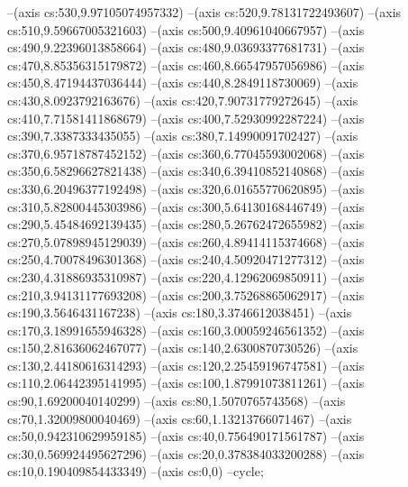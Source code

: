 --(axis cs:530,9.97105074957332)
--(axis cs:520,9.78131722493607)
--(axis cs:510,9.59667005321603)
--(axis cs:500,9.40961040667957)
--(axis cs:490,9.22396013858664)
--(axis cs:480,9.03693377681731)
--(axis cs:470,8.85356315179872)
--(axis cs:460,8.66547957056986)
--(axis cs:450,8.47194437036444)
--(axis cs:440,8.2849118730069)
--(axis cs:430,8.0923792163676)
--(axis cs:420,7.90731779272645)
--(axis cs:410,7.71581411868679)
--(axis cs:400,7.52930992287224)
--(axis cs:390,7.3387333435055)
--(axis cs:380,7.14990091702427)
--(axis cs:370,6.95718787452152)
--(axis cs:360,6.77045593002068)
--(axis cs:350,6.58296627821438)
--(axis cs:340,6.39410852140868)
--(axis cs:330,6.20496377192498)
--(axis cs:320,6.01655770620895)
--(axis cs:310,5.82800445303986)
--(axis cs:300,5.64130168446749)
--(axis cs:290,5.45484692139435)
--(axis cs:280,5.26762472655982)
--(axis cs:270,5.07898945129039)
--(axis cs:260,4.89414115374668)
--(axis cs:250,4.70078496301368)
--(axis cs:240,4.50920471277312)
--(axis cs:230,4.31886935310987)
--(axis cs:220,4.12962069850911)
--(axis cs:210,3.94131177693208)
--(axis cs:200,3.75268865062917)
--(axis cs:190,3.5646431167238)
--(axis cs:180,3.3746612038451)
--(axis cs:170,3.18991655946328)
--(axis cs:160,3.00059246561352)
--(axis cs:150,2.81636062467077)
--(axis cs:140,2.6300870730526)
--(axis cs:130,2.44180616314293)
--(axis cs:120,2.25459196747581)
--(axis cs:110,2.06442395141995)
--(axis cs:100,1.87991073811261)
--(axis cs:90,1.69200040140299)
--(axis cs:80,1.5070765743568)
--(axis cs:70,1.32009800040469)
--(axis cs:60,1.13213766071467)
--(axis cs:50,0.942310629959185)
--(axis cs:40,0.756490171561787)
--(axis cs:30,0.569924495627296)
--(axis cs:20,0.378384033200288)
--(axis cs:10,0.190409854433349)
--(axis cs:0,0)
--cycle;

